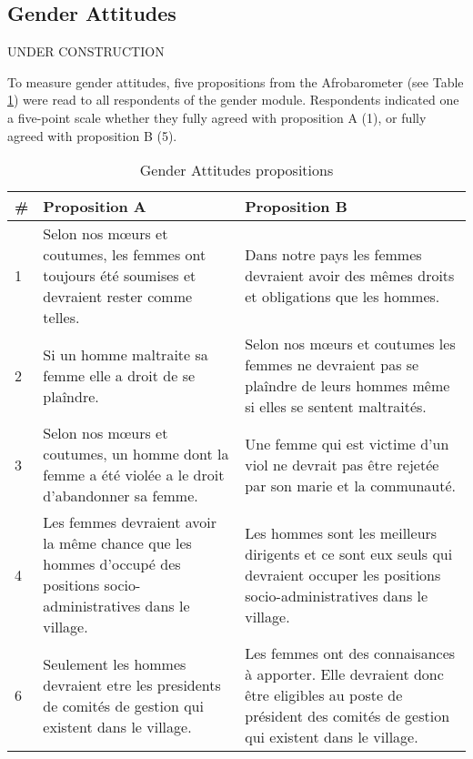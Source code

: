 \documentclass[11pt,a4paper]{scrartcl} %
\begin{document}
\subsection*{Gender Attitudes}
UNDER CONSTRUCTION

To measure gender attitudes, five propositions from the Afrobarometer (see Table \ref{tab:genderatt}) were read to all respondents of the gender module. Respondents indicated one a five-point scale whether they fully agreed with proposition A (1), or fully agreed with proposition B (5).

\begin{table}
\centering
\caption{Gender Attitudes propositions}
\label{tab:genderatt}
\begin{tabularx}{\textwidth}{l X X}

\toprule
\# & Proposition A & Proposition B \\
\hline
1 & Selon nos mœurs et coutumes, les femmes ont toujours été soumises et devraient rester comme telles. &	Dans notre pays les femmes devraient avoir des mêmes droits et obligations que les hommes. \\
2 & Si un homme maltraite sa femme elle a droit de se plaîndre. &	Selon nos mœurs et coutumes les femmes ne devraient pas se plaîndre de leurs hommes même si elles se sentent maltraités. \\
3 & Selon nos mœurs et coutumes, un homme dont la femme a été violée a le droit d’abandonner sa femme. &	Une femme qui est victime d’un viol ne devrait pas être rejetée par son marie et la communauté.\\
4 & Les femmes devraient avoir la même chance que les hommes d’occupé des positions socio-administratives dans le village. & 	Les hommes sont les meilleurs dirigents et ce sont eux seuls qui devraient occuper les positions socio-administratives dans le village. \\
6 & Seulement les hommes devraient etre les presidents de comités de gestion qui existent dans le village. &	Les femmes ont des connaisances à apporter. Elle devraient donc être eligibles au poste de président des comités de gestion qui existent dans le village. \\
\bottomrule
\end{tabularx}
\end{table}
\end{document}
